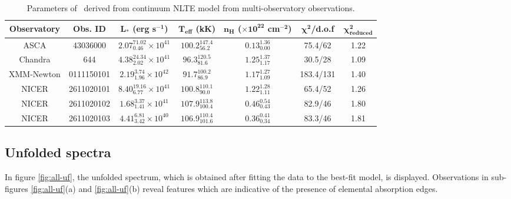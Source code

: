     \begin{table}[!htb]
    	\centering
    	\caption{Parameters of \source\ derived from continuum NLTE model from multi-observatory observations.}
    	\label{tab:res-fitting}
    	\begin{tabular}{ccccccc}
			\hline
			{\textbf{Observatory}} & {\textbf{Obs. ID}} & {$\boldsymbol{L_*}$ \textbf{(erg s$\boldsymbol{^{-1}}$)}} & {\textbf{$\boldsymbol{T_\text{eff}}$ (kK)}} & {\textbf{$\boldsymbol{n_H}$ ($\boldsymbol{\times 10^{22}}$ cm$\boldsymbol{^{-2}}$)}} & {$\boldsymbol{\chi^2}$/\textbf{d.o.f}} & {$\boldsymbol{\chi^2_\text{reduced}}$} \\
			\hline
			{ASCA} & {43036000} & {$2.07_{0.46}^{71.02}\times 10^{41}$} & {$100.2_{56.2}^{147.4}$} & {$0.13_{0.00}^{1.36}$} & {75.4/62} & {1.22} \\ %
			{Chandra} & {644} & {$4.38_{2.02}^{24.34}\times 10^{41}$} & {$96.3_{81.6}^{120.5}$} & {$1.25_{1.17}^{1.37}$} & {30.5/28} & {1.09} \\ %
			{XMM-Newton} & {0111150101} & {$2.19_{1.96}^{3.74}\times 10^{42}$} & {$91.7_{86.9}^{100.2}$} & {$1.17_{1.09}^{1.27}$} & {183.4/131} & {1.40} \\ %
			{NICER} & {2611020101} & {$8.40_{6.77}^{19.16}\times 10^{41}$} & {$100.8_{90.0}^{110.1}$} & {$1.22_{1.11}^{1.28}$} & {65.4/52} & {1.26} \\ %
			{NICER} & {2611020102} & {$1.68_{1.41}^{3.37}\times 10^{41}$} & {$107.9_{100.4}^{113.8}$} & {$0.46_{0.43}^{0.54}$} & {82.9/46} & {1.80} \\ %
			{NICER} & {2611020103} & {$4.41_{3.42}^{6.81}\times 10^{40}$} & {$106.9_{101.6}^{110.4}$} & {$0.36_{0.34}^{0.41}$} & {83.3/46} & {1.81} \\ %
			\hline
		\end{tabular}
	\end{table}
    
    \subsection{Unfolded spectra}
    In figure \ref{fig:all-uf}, the unfolded spectrum, which is obtained after fitting the data to the best-fit model, is displayed. Observations in sub-figures \ref{fig:all-uf}(a) and \ref{fig:all-uf}(b) reveal features which are indicative of the presence of elemental absorption edges.
    
